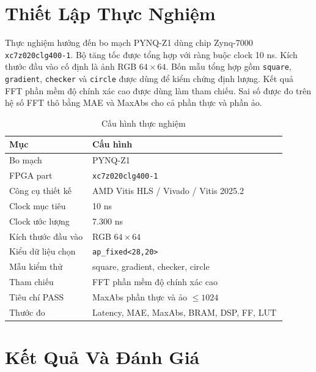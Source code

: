 ﻿\documentclass[conference]{IEEEtran}
\begin{document}
\section{Thiết Lập Thực Nghiệm}
\label{sec:experimental}
Thực nghiệm hướng đến bo mạch PYNQ-Z1 dùng chip Zynq-7000 \texttt{xc7z020clg400-1}. Bộ tăng tốc được tổng hợp với ràng buộc clock 10 ns. Kích thước đầu vào cố định là ảnh RGB $64\times64$. Bốn mẫu tổng hợp gồm \texttt{square}, \texttt{gradient}, \texttt{checker} và \texttt{circle} được dùng để kiểm chứng định lượng. Kết quả FFT phần mềm độ chính xác cao được dùng làm tham chiếu. Sai số được đo trên hệ số FFT thô bằng MAE và MaxAbs cho cả phần thực và phần ảo.

\begin{table}[htbp]
    \caption{Cấu hình thực nghiệm}
    \centering
    \label{tab:experimental_config}
    \footnotesize
    \setlength{\tabcolsep}{3pt}
    \begin{tabular}{@{}p{0.27\linewidth}p{0.63\linewidth}@{}}
        \toprule
        \textbf{Mục}       & \textbf{Cấu hình}                        \\
        \midrule
        Bo mạch            & PYNQ-Z1                                  \\
        FPGA part          & \texttt{xc7z020clg400-1}                 \\
        Công cụ thiết kế   & AMD Vitis HLS / Vivado / Vitis 2025.2    \\
        Clock mục tiêu     & 10 ns                                    \\
        Clock ước lượng    & 7.300 ns                                 \\
        Kích thước đầu vào & RGB $64\times64$                         \\
        Kiểu dữ liệu chọn  & \texttt{ap\_fixed<28,20>}                \\
        Mẫu kiểm thử       & square, gradient, checker, circle        \\
        Tham chiếu         & FFT phần mềm độ chính xác cao            \\
        Tiêu chí PASS      & MaxAbs phần thực và ảo $\leq 1024$       \\
        Thước đo           & Latency, MAE, MaxAbs, BRAM, DSP, FF, LUT \\
        \bottomrule
    \end{tabular}
\end{table}

\section{Kết Quả Và Đánh Giá}
\label{sec:results}
\end{document}
